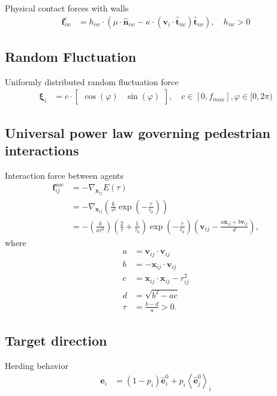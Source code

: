 Physical contact forces with walls
\begin{align}
\mathbf{f}_{iw}^{c} &= h_{iw} \cdot \left(\mu \cdot \hat{\mathbf{n}}_{iw} - \kappa \cdot (\mathbf{v}_{i} \cdot \hat{\mathbf{t}}_{iw}) \hat{\mathbf{t}}_{iw}\right), \quad h_{iw} > 0
\end{align}


\subsection{Random Fluctuation}
Uniformly distributed random fluctuation force
\begin{align}
\boldsymbol{\xi}_{i} &= c \cdot \begin{bmatrix} \cos(\varphi) & \sin(\varphi) \end{bmatrix}, \quad c \in [0, f_{max}], \varphi \in [0, 2 \pi)
\end{align}



\subsection{Universal power law governing pedestrian interactions}
Interaction force between agents
\begin{align}
\mathbf{f}_{ij}^{soc} &= -\nabla_{\mathbf{x}_{ij}} E(\tau)  \\
&= -\nabla_{\mathbf{x}_{ij}} \left(\frac{k}{\tau^{2}} \exp \left( -\frac{\tau}{\tau_{0}} \right) \right) \\
&= - \left(\frac{k}{a \tau^{2}}\right) 
\left(\frac{2}{\tau} + \frac{1}{\tau_{0}}\right) 
\exp\left (-\frac{\tau}{\tau_{0}}\right )
\left(\mathbf{v}_{ij} -\frac{a \mathbf{x}_{ij} + b \mathbf{v}_{ij}}{d} \right),
\end{align}
where
\begin{align}
a &= \mathbf{v}_{ij} \cdot \mathbf{v}_{ij} \\
b &= -\mathbf{x}_{ij} \cdot \mathbf{v}_{ij} \\
c &= \mathbf{x}_{ij} \cdot \mathbf{x}_{ij} - r_{ij}^{2} \\
d &= \sqrt{b^{2} - a c} \\
\tau &= \frac{b - d}{a} > 0.
\end{align}


\subsection{Target direction}
Herding behavior
\begin{align}
\mathbf{e}_{i} &= (1 - p_{i}) \hat{\mathbf{e}}_{i}^{0} + p_{i} \left\langle \hat{\mathbf{e}}_{j}^{0} \right\rangle_{i}
\end{align}